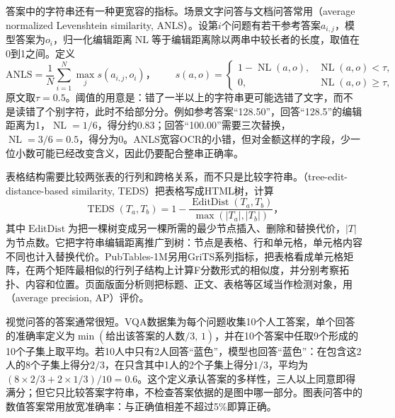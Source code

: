 答案中的字符串还有一种更宽容的指标。场景文字问答与文档问答常用（average normalized Levenshtein similarity, ANLS）。设第$i$个问题有若干参考答案$a_{i,j}$，模型答案为$o_i$，归一化编辑距离$\operatorname{NL}$等于编辑距离除以两串中较长者的长度，取值在0到1之间。定义
\begin{equation}
  \mathrm{ANLS}=\frac1N\sum_{i=1}^{N}\max_j s(a_{i,j},o_i)\text{，}\qquad
  s(a,o)=\begin{cases}
    1-\operatorname{NL}(a,o), & \operatorname{NL}(a,o)<\tau,\\
    0, & \operatorname{NL}(a,o)\geq\tau,
  \end{cases}
  \label{eq:vision-understanding-anls}
\end{equation}
原文取$\tau=0.5$。阈值的用意是：错了一半以上的字符串更可能选错了文字，而不是读错了个别字符，此时不给部分分。例如参考答案“128.50”，回答“128.5”的编辑距离为1，$\operatorname{NL}=1/6$，得分约0.83；回答“100.00”需要三次替换，$\operatorname{NL}=3/6=0.5$，得分为0。ANLS宽容OCR的小错，但对金额这样的字段，少一位小数可能已经改变含义，因此仍要配合整串正确率。

表格结构需要比较两张表的行列和跨格关系，而不只是比较字符串。（tree-edit-distance-based similarity, TEDS）把表格写成HTML树，计算
\begin{equation}
  \operatorname{TEDS}(T_a,T_b)=1-\frac{\operatorname{EditDist}(T_a,T_b)}{\max(|T_a|,|T_b|)}\text{，}
  \label{eq:vision-understanding-teds}
\end{equation}
其中$\operatorname{EditDist}$为把一棵树变成另一棵所需的最少节点插入、删除和替换代价，$|T|$为节点数。它把字符串编辑距离推广到树：节点是表格、行和单元格，单元格内容不同也计入替换代价。PubTables-1M另用GriTS系列指标，把表格看成单元格矩阵，在两个矩阵最相似的行列子结构上计算F分数形式的相似度，并分别考察拓扑、内容和位置。页面版面分析则把标题、正文、表格等区域当作检测对象，用（average precision, AP）评价。

视觉问答的答案通常很短。VQA数据集为每个问题收集10个人工答案，单个回答的准确率定义为$\min(\text{给出该答案的人数}/3,\,1)$，并在10个答案中任取9个形成的10个子集上取平均。若10人中只有2人回答“蓝色”，模型也回答“蓝色”：在包含这2人的8个子集上得分$2/3$，在只含其中1人的2个子集上得分$1/3$，平均为$(8\times2/3+2\times1/3)/10=0.6$。这个定义承认答案的多样性，三人以上同意即得满分；但它只比较答案字符串，不检查答案依据的是图中哪一部分。图表问答中的数值答案常用放宽准确率：与正确值相差不超过5\%即算正确。

